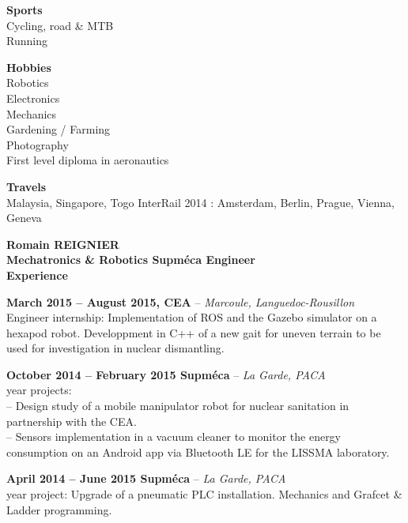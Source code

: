 \documentclass[a4paper,11pt,final]{memoir}
\newcommand{\Sep}{\vspace{1.5em}}
\newcommand{\SmallSep}{\vspace{0.5em}}
\newenvironment{AboutMe}
	{\ignorespaces%
}
	{\Sep\ignorespacesafterend}
\newcommand{\CVSection}[1]
	{\Large\textbf{#1}\par
	\SmallSep\normalsize\normalfont}
\newcommand{\CVItem}[2]
	{\textbf{\color{RoyalBlue} #1 \color{dark_gray} #2}\normalsize\normalfont}
\newcommand{\city}[1]
	{{\small\color{dark_gray}\emph{#1}}\normalsize\normalfont}
\newcommand{\SkillSection}[1]
	{\normalsize{\textbf{#1\\}}\normalfont\small}%
\begin{document}
\begin{flushleft}
\SkillSection{Sports}
Cycling, road \& MTB\\
Running\\
\SmallSep

\SkillSection{Hobbies}
Robotics\\
Electronics\\
Mechanics\\
Gardening / Farming\\
Photography\\
First level diploma in aeronautics\SmallSep

\SkillSection{Travels}
Malaysia, Singapore, Togo
InterRail 2014 : Amsterdam, Berlin, Prague, Vienna, Geneva
\end{flushleft}
\framebreak


\Huge\bfseries {\color{RoyalBlue} Romain REIGNIER} \\
\Large\bfseries Mechatronics \& Robotics Supméca Engineer\\

\CVSection{Experience}
\CVItem{March 2015 -- August 2015,}{CEA} -- \city{Marcoule, Languedoc-Rousillon}\\
Engineer internship: Implementation of ROS and the Gazebo simulator on a hexapod robot. Developpment in C++ of a new gait for uneven terrain to be used for investigation in nuclear dismantling.\SmallSep

\CVItem{October 2014 -- February 2015}{Supméca} -- \city{La Garde, PACA}\\
 year projects:\\
-- Design study of a mobile manipulator robot for nuclear sanitation in partnership with the CEA.\\
-- Sensors implementation in a vacuum cleaner to monitor the energy consumption on an Android app via Bluetooth LE for the LISSMA laboratory.\SmallSep

\CVItem{April 2014 -- June 2015}{Supméca} -- \city{La Garde, PACA}\\
 year project: Upgrade of a pneumatic PLC installation. Mechanics and Grafcet \& Ladder programming.
\SmallSep
\end{document}
